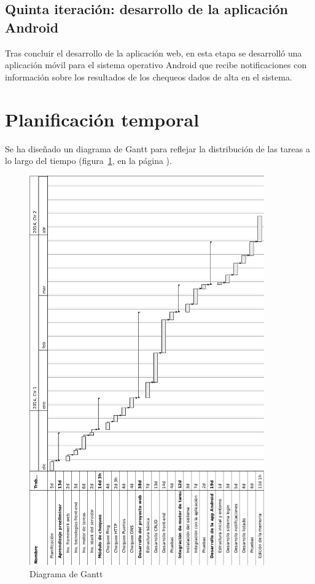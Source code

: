 \subsection{Quinta iteración: desarrollo de la aplicación Android}

Tras concluir el desarrollo de la aplicación web, en esta etapa se desarrolló
una aplicación móvil para el sistema operativo Android que recibe notificaciones
con información sobre los resultados de los chequeos dados de alta en el sistema.

\section{Planificación temporal}
\label{sec:planificacion}
Se ha diseñado un diagrama de Gantt para reflejar la distribución de las tareas
a lo largo del tiempo (figura~\ref{fig:gantt}, en la página \pageref{fig:gantt}).

\begin{figure}[htbp]
  \centering
  \includegraphics[width=0.9\textwidth]{2_calendario/imagen_diagrama_gantt}
  \caption{Diagrama de Gantt}
  \label{fig:gantt}
\end{figure}

